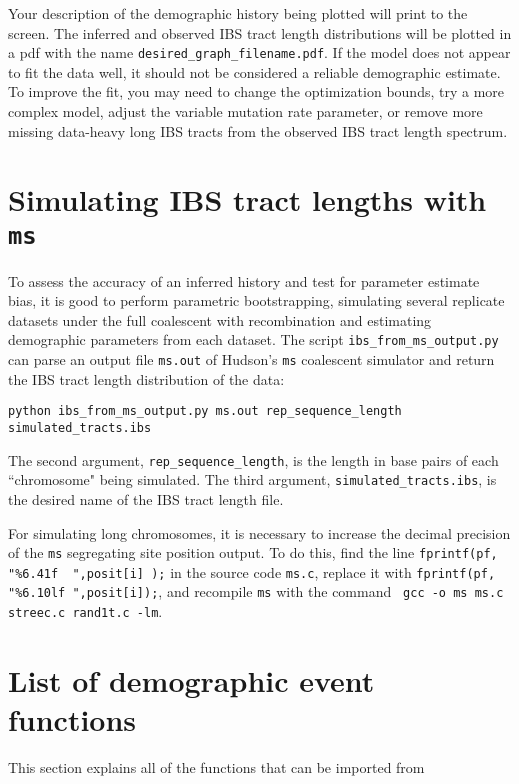 \documentclass[12pt]{article}
\begin{document}
Your description of the demographic history being plotted will print to the screen. The inferred and observed IBS tract length distributions will be plotted in a pdf with the name \verb|desired_graph_filename.pdf|. If the model does not appear to fit the data well, it should not be considered a reliable demographic estimate. To improve the fit, you may need to change the optimization bounds, try a more complex model, adjust the variable mutation rate parameter, or remove more missing data-heavy long IBS tracts from the observed IBS tract length spectrum. 

\section{Simulating IBS tract lengths with \texttt{ms}}

To assess the accuracy of an inferred history and test for parameter estimate bias, it is good to perform parametric bootstrapping, simulating several replicate datasets under the full coalescent with recombination and estimating demographic parameters from each dataset. The script \verb|ibs_from_ms_output.py| can parse an output file \verb|ms.out| of Hudson's \texttt{ms} coalescent simulator \cite{ms} and return the IBS tract length distribution of the data:

\begin{Verbatim}
python ibs_from_ms_output.py ms.out rep_sequence_length simulated_tracts.ibs
\end{Verbatim}

The second argument, \verb|rep_sequence_length|, is the length in base pairs of each ``chromosome" being simulated. The third argument, \verb|simulated_tracts.ibs|, is the desired name of the IBS tract length file.

For simulating long chromosomes, it is necessary to increase the decimal precision of the \verb|ms| segregating site position output. To do this, find the line \verb|fprintf(pf, "%6.41f  ",posit[i] );| in the source code \verb|ms.c|,  replace it with \verb|fprintf(pf, "%6.10lf ",posit[i]);|, and recompile \texttt{ms} with the command \verb| gcc -o ms ms.c streec.c rand1t.c -lm|. 

\section{List of demographic event functions}\label{list_commands}
This section explains all of the functions that can be imported from 
\end{document}
